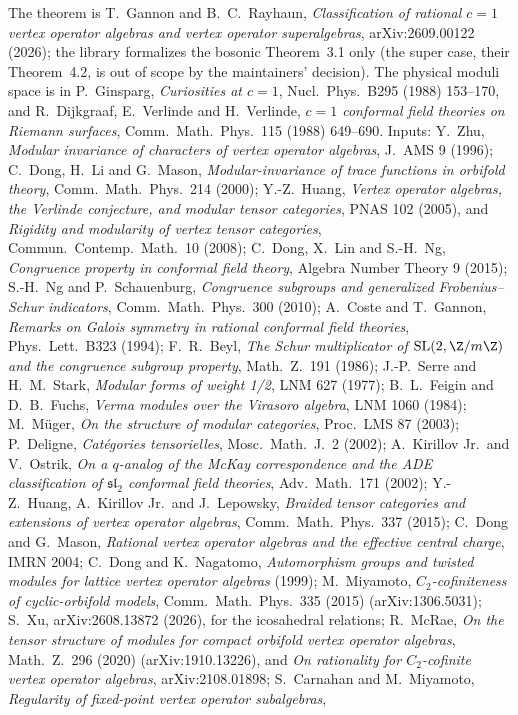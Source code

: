 The theorem is T.~Gannon and B.~C.~Rayhaun, \emph{Classification of rational $c=1$ vertex operator algebras and vertex
operator superalgebras}, arXiv:2609.00122 (2026); the library formalizes the bosonic Theorem~3.1 only (the super case,
their Theorem~4.2, is out of scope by the maintainers' decision). The physical moduli space is in P.~Ginsparg,
\emph{Curiosities at $c=1$}, Nucl.\ Phys.\ B295 (1988) 153--170, and R.~Dijkgraaf, E.~Verlinde and H.~Verlinde,
\emph{$c=1$ conformal field theories on Riemann surfaces}, Comm.\ Math.\ Phys.\ 115 (1988) 649--690. Inputs:
Y.~Zhu, \emph{Modular invariance of characters of vertex operator algebras}, J.\ AMS 9 (1996); C.~Dong, H.~Li and
G.~Mason, \emph{Modular-invariance of trace functions in orbifold theory}, Comm.\ Math.\ Phys.\ 214 (2000);
Y.-Z.~Huang, \emph{Vertex operator algebras, the Verlinde conjecture, and modular tensor categories}, PNAS 102 (2005),
and \emph{Rigidity and modularity of vertex tensor categories}, Commun.\ Contemp.\ Math.\ 10 (2008); C.~Dong, X.~Lin
and S.-H.~Ng, \emph{Congruence property in conformal field theory}, Algebra Number Theory 9 (2015); S.-H.~Ng and
P.~Schauenburg, \emph{Congruence subgroups and generalized Frobenius--Schur indicators}, Comm.\ Math.\ Phys.\ 300 (2010);
A.~Coste and T.~Gannon, \emph{Remarks on Galois symmetry in rational conformal field theories}, Phys.\ Lett.\ B323
(1994); F.~R.~Beyl, \emph{The Schur multiplicator of $\mathrm{SL}(2,\Z/m\Z)$ and the congruence subgroup property},
Math.\ Z.\ 191 (1986); J.-P.~Serre and H.~M.~Stark, \emph{Modular forms of weight 1/2}, LNM 627 (1977);
B.~L.~Feigin and D.~B.~Fuchs, \emph{Verma modules over the Virasoro algebra}, LNM 1060 (1984); M.~Müger, \emph{On the
structure of modular categories}, Proc.\ LMS 87 (2003); P.~Deligne, \emph{Catégories tensorielles}, Mosc.\ Math.\ J.\ 2
(2002); A.~Kirillov Jr.\ and V.~Ostrik, \emph{On a $q$-analog of the McKay correspondence and the ADE classification of
$\mathfrak{sl}_2$ conformal field theories}, Adv.\ Math.\ 171 (2002); Y.-Z.~Huang, A.~Kirillov Jr.\ and J.~Lepowsky,
\emph{Braided tensor categories and extensions of vertex operator algebras}, Comm.\ Math.\ Phys.\ 337 (2015); C.~Dong
and G.~Mason, \emph{Rational vertex operator algebras and the effective central charge}, IMRN 2004; C.~Dong and
K.~Nagatomo, \emph{Automorphism groups and twisted modules for lattice vertex operator algebras} (1999); M.~Miyamoto,
\emph{$C_2$-cofiniteness of cyclic-orbifold models}, Comm.\ Math.\ Phys.\ 335 (2015) (arXiv:1306.5031); S.~Xu,
arXiv:2608.13872 (2026), for the icosahedral relations; R.~McRae, \emph{On the tensor structure of modules for compact
orbifold vertex operator algebras}, Math.\ Z.\ 296 (2020) (arXiv:1910.13226), and \emph{On rationality for
$C_2$-cofinite vertex operator algebras}, arXiv:2108.01898; S.~Carnahan and M.~Miyamoto, \emph{Regularity of fixed-point vertex operator subalgebras},
